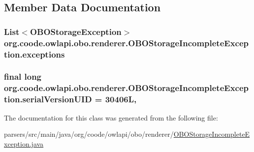 \subsection{Member Data Documentation}
\hypertarget{classorg_1_1coode_1_1owlapi_1_1obo_1_1renderer_1_1_o_b_o_storage_incomplete_exception_a8a65c3684f3cc8d13c26409ca8fbb412}{
\subsubsection[{exceptions}]{\setlength{\rightskip}{0pt plus 5cm}List$<${\bf O\-B\-O\-Storage\-Exception}$>$ org.\-coode.\-owlapi.\-obo.\-renderer.\-O\-B\-O\-Storage\-Incomplete\-Exception.\-exceptions\hspace{0.3cm}{\ttfamily [private]}}}\label{classorg_1_1coode_1_1owlapi_1_1obo_1_1renderer_1_1_o_b_o_storage_incomplete_exception_a8a65c3684f3cc8d13c26409ca8fbb412}
\hypertarget{classorg_1_1coode_1_1owlapi_1_1obo_1_1renderer_1_1_o_b_o_storage_incomplete_exception_a5f735a839b99ec52a744c72900cc9b22}{
\subsubsection[{serial\-Version\-U\-I\-D}]{\setlength{\rightskip}{0pt plus 5cm}final long org.\-coode.\-owlapi.\-obo.\-renderer.\-O\-B\-O\-Storage\-Incomplete\-Exception.\-serial\-Version\-U\-I\-D = 30406\-L\hspace{0.3cm}{\ttfamily [static]}, {\ttfamily [private]}}}\label{classorg_1_1coode_1_1owlapi_1_1obo_1_1renderer_1_1_o_b_o_storage_incomplete_exception_a5f735a839b99ec52a744c72900cc9b22}


The documentation for this class was generated from the following file\-:\begin{DoxyCompactItemize}
\item 
parsers/src/main/java/org/coode/owlapi/obo/renderer/\hyperlink{_o_b_o_storage_incomplete_exception_8java}{O\-B\-O\-Storage\-Incomplete\-Exception.\-java}\end{DoxyCompactItemize}
